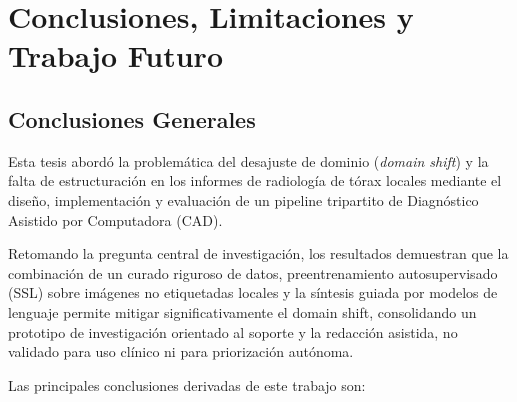 \documentclass[../tesis.tex]{subfiles}
\begin{document}
\chapter{Conclusiones, Limitaciones y Trabajo Futuro}

\section{Conclusiones Generales}

Esta tesis abordó la problemática del desajuste de dominio (\textit{domain shift}) y la falta de estructuración en los informes de radiología de tórax locales mediante el diseño, implementación y evaluación de un pipeline tripartito de Diagnóstico Asistido por Computadora (CAD). 

Retomando la pregunta central de investigación, los resultados demuestran que la combinación de un curado riguroso de datos, preentrenamiento autosupervisado (SSL) sobre imágenes no etiquetadas locales y la síntesis guiada por modelos de lenguaje permite mitigar significativamente el domain shift, consolidando un prototipo de investigación orientado al soporte y la redacción asistida, no validado para uso clínico ni para priorización autónoma.

Las principales conclusiones derivadas de este trabajo son:
\end{document}
